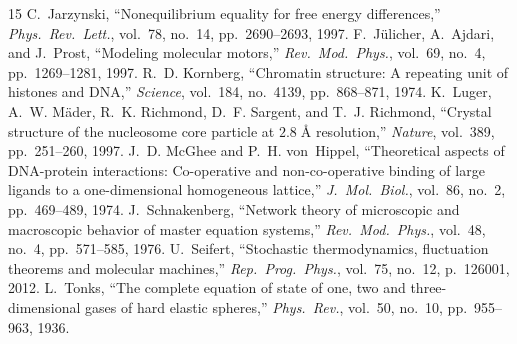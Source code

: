 \documentclass[11pt,a4paper]{article}
\theoremstyle{definition}
\begin{document}
\begin{thebibliography}{15}
 C.~Jarzynski, ``Nonequilibrium equality for free energy differences,'' \emph{Phys.\ Rev.\ Lett.}, vol.~78, no.~14, pp.~2690--2693, 1997.
 F.~J\"ulicher, A.~Ajdari, and J.~Prost, ``Modeling molecular motors,'' \emph{Rev.\ Mod.\ Phys.}, vol.~69, no.~4, pp.~1269--1281, 1997.
 R.~D. Kornberg, ``Chromatin structure: A repeating unit of histones and DNA,'' \emph{Science}, vol.~184, no.~4139, pp.~868--871, 1974.
 K.~Luger, A.~W. M\"ader, R.~K. Richmond, D.~F. Sargent, and T.~J. Richmond, ``Crystal structure of the nucleosome core particle at $2.8\;\text{\AA}$ resolution,'' \emph{Nature}, vol.~389, pp.~251--260, 1997.
 J.~D. McGhee and P.~H. von~Hippel, ``Theoretical aspects of DNA-protein interactions: Co-operative and non-co-operative binding of large ligands to a one-dimensional homogeneous lattice,'' \emph{J.\ Mol.\ Biol.}, vol.~86, no.~2, pp.~469--489, 1974.
 J.~Schnakenberg, ``Network theory of microscopic and macroscopic behavior of master equation systems,'' \emph{Rev.\ Mod.\ Phys.}, vol.~48, no.~4, pp.~571--585, 1976.
 U.~Seifert, ``Stochastic thermodynamics, fluctuation theorems and molecular machines,'' \emph{Rep.\ Prog.\ Phys.}, vol.~75, no.~12, p.~126001, 2012.
 L.~Tonks, ``The complete equation of state of one, two and three-dimensional gases of hard elastic spheres,'' \emph{Phys.\ Rev.}, vol.~50, no.~10, pp.~955--963, 1936.
\end{thebibliography}
\end{document}
